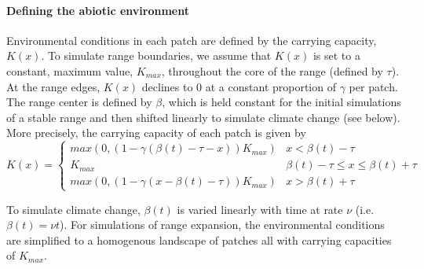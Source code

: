 \documentclass[11pt]{article}
\begin{document}
\paragraph{Defining the abiotic environment}
Environmental conditions in each patch are defined by the carrying capacity, $K(x)$. To simulate range boundaries, we assume that $K(x)$ is set to a constant, maximum value, $K_{max}$, throughout the core of the range (defined by $\tau$). At the range edges, $K(x)$ declines to $0$ at a constant proportion of $\gamma$ per patch. The range center is defined by $\beta$, which is held constant for the initial simulations of a stable range and then shifted linearly to simulate climate change (see below). More precisely, the carrying capacity of each patch is given by
\begin{equation}
K(x)=
\begin{cases}
	max(0, (1-\gamma(\beta(t) - \tau - x))K_{max}) & x < \beta(t) - \tau \\
	K_{max} & \beta(t) - \tau \leq x \leq \beta(t) + \tau \\
	max(0, (1-\gamma(x - \beta(t) - \tau))K_{max}) & x > \beta(t) + \tau
\end{cases}
\end{equation}
 
 To simulate climate change, $\beta(t)$ is varied linearly with time at rate $\nu$ (i.e. $\beta(t)=\nu t$). For simulations of range expansion, the environmental conditions are simplified to a homogenous landscape of patches all with carrying capacities of $K_{max}$. 
\end{document}
